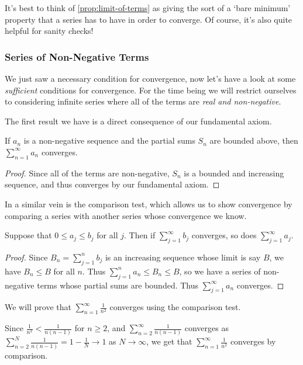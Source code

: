 It's best to think of \autoref{prop:limit-of-terms} as giving the sort of a `bare minimum' property that a series has to have in order to converge. Of course, it's also quite helpful for sanity checks!

\subsubsection{Series of Non-Negative Terms}

We just saw a necessary condition for convergence, now let's have a look at some \emph{sufficient} conditions for convergence. For the time being we will restrict ourselves to considering infinite series where all of the terms are \emph{real and non-negative}.

The first result we have is a direct consequence of our fundamental axiom.

\begin{theorem}
	If $a_n$ is a non-negative sequence and the partial sums $S_n$ are bounded above, then $\sum_{n = 1}^{\infty} a_n$ converges.
\end{theorem}
\begin{proof}
	Since all of the terms are non-negative, $S_n$ is a bounded and increasing sequence, and thus converges by our fundamental axiom.
\end{proof}

In a similar vein is the comparison test, which allows us to show convergence by comparing a series with another series whose convergence we know.

\begin{theorem}
	Suppose that $0 \leq a_j \leq b_j$ for all $j$. Then if $\sum_{j = 1}^{\infty} b_j$ converges, so does $\sum_{j = 1}^{\infty} a_j$.
\end{theorem}
\begin{proof}
	Since $B_n = \sum_{j = 1}^n b_j$ is an increasing sequence whose limit is say $B$, we have $B_n \leq B$ for all $n$. 
	Thus $\sum_{j = 1}^n a_n \leq B_n \leq B$, so we have a series of non-negative terms whose partial sums are bounded. Thus $\sum_{j = 1}^\infty a_n$ converges.
\end{proof}

\begin{example}
	We will prove that $\sum_{n = 1}^{\infty} \frac{1}{n^2}$ converges using the comparison test.

	Since $\frac{1}{n^2} < \frac{1}{n(n - 1)}$ for $n \geq 2$, and $\sum_{n = 2}^{\infty} \frac{1}{n(n - 1)}$ converges as
	$\sum_{n = 2}^N \frac{1}{n(n - 1)} = 1 - \frac{1}{N} \rightarrow 1$ as $N \rightarrow \infty$, we get that $\sum_{n = 1}^{\infty} \frac{1}{n^2}$ converges by comparison.
\end{example}

